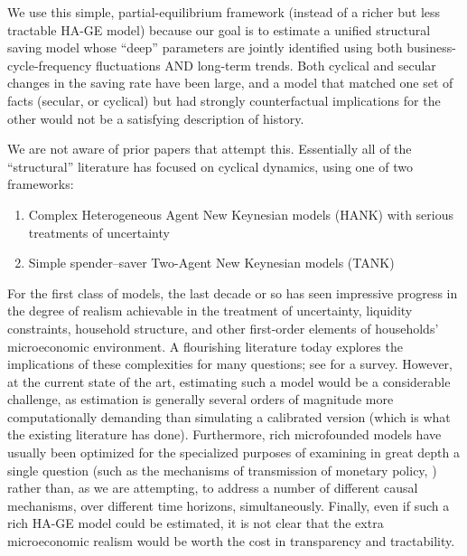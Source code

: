 
We use this simple, partial-equilibrium framework (instead of a richer but less tractable HA-GE model) because our goal is to estimate a unified structural saving model whose ``deep'' parameters are jointly identified using both business-cycle-frequency fluctuations AND long-term trends.  Both cyclical and secular changes in the saving rate have been large, and a model that matched one set of facts (secular, or cyclical) but had strongly counterfactual implications for the other would not be a satisfying description of history.

We are not aware of prior papers that attempt this.  Essentially all of the ``structural'' literature has focused on cyclical dynamics, using one of two frameworks:
\begin{enumerate}
\item Complex Heterogeneous Agent New Keynesian models (HANK) with serious treatments of uncertainty
    \item Simple spender--saver Two-Agent New Keynesian models (TANK)
\end{enumerate}



\hypertarget{HA-Model-Too-Hard-Right-Now}{}
\hypertarget{HA-Models-Not-Used-Yet-For-Forecasting}{}
For the first class of models, the last decade or so has seen impressive progress in the degree of realism achievable in the treatment of uncertainty, liquidity constraints, household structure, and other first-order elements of households' microeconomic environment. A flourishing literature today %
explores the implications of these complexities for many questions; see \cite{kmpHandbook} for a survey.
However, at the current state of the art, estimating such a model would be a considerable challenge, as estimation is generally several orders of magnitude more computationally demanding than simulating a calibrated version (which is what the existing literature has done).  Furthermore, rich microfounded models have usually been optimized for the specialized purposes of examining in great depth a single question (such as the mechanisms of transmission of monetary policy, \cite{kmvHANK}) rather than, as we are attempting, to address a number of different causal mechanisms, over different time horizons, simultaneously.  Finally, even if such a rich HA-GE model could be estimated, it is not clear that the extra microeconomic realism would be worth the cost in transparency and tractability.

